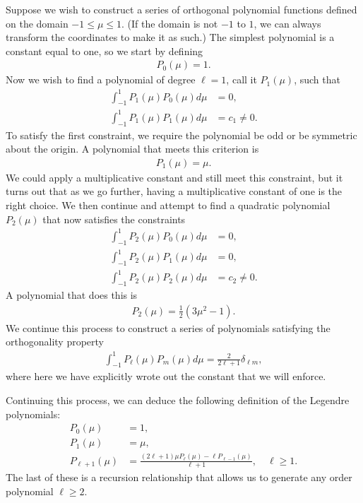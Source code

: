 Suppose we wish to construct a series of orthogonal polynomial functions defined on the domain $-1 \le \mu \le 1$. (If the domain is not $-1$ to $1$, we can always transform the coordinates to make it as such.) The simplest polynomial is a constant equal to one, so we start by defining
\begin{align}
  P_0(\mu) = 1. \nonumber
\end{align}
Now we wish to find a polynomial of degree $\ell = 1$, call it $P_1(\mu)$, such that
\begin{align}
  \int_{-1}^1 P_1(\mu) P_0(\mu) d\mu &= 0, \nonumber \\
  \int_{-1}^1 P_1(\mu) P_1(\mu) d\mu &= c_1 \ne 0 . \nonumber
\end{align}
To satisfy the first constraint, we require the polynomial be odd or be symmetric about the origin. A polynomial that meets this criterion is
\begin{align}
  P_1(\mu) = \mu . \nonumber
\end{align}
We could apply a multiplicative constant and still meet this constraint, but it turns out that as we go further, having a multiplicative constant of one is the right choice. We then continue and attempt to find a quadratic polynomial $P_2(\mu)$ that now satisfies the constraints
\begin{align}
  \int_{-1}^1 P_2(\mu) P_0(\mu) d\mu &= 0, \nonumber \\
  \int_{-1}^1 P_2(\mu) P_1(\mu) d\mu &= 0, \nonumber \\
  \int_{-1}^1 P_2(\mu) P_2(\mu) d\mu &= c_2 \ne 0 . \nonumber
\end{align}
A polynomial that does this is
\begin{align}
  P_2(\mu) = \frac{1}{2} \left( 3 \mu^2 - 1 \right) . \nonumber
\end{align}
We continue this process to construct a series of polynomials satisfying the orthogonality property
\begin{align}
  \int_{-1}^1 P_\ell(\mu) P_m(\mu) d\mu = \frac{ 2 }{ 2 \ell + 1 } \delta_{\ell m} ,
\end{align}
where here we have explicitly wrote out the constant that we will enforce.

Continuing this process, we can deduce the following definition of the Legendre polynomials:
\begin{subequations}
\begin{align}
  P_0(\mu) &= 1, \\
  P_1(\mu) &= \mu, \\
  P_{\ell+1}(\mu) &= \frac{ ( 2\ell + 1 ) \mu P_\ell(\mu) - \ell P_{\ell - 1}( \mu ) }{ \ell + 1 } , \quad \ell \ge 1.
\end{align}
\end{subequations}
The last of these is a recursion relationship that allows us to generate any order polynomial $\ell \ge 2$.

